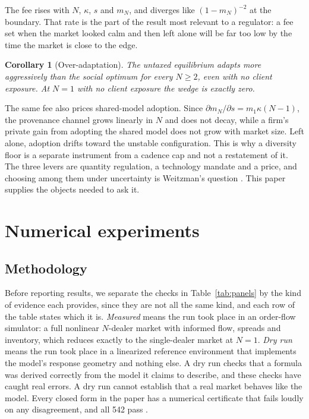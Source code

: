 \documentclass[conference]{IEEEtran}
\theoremstyle{plain}
\newtheorem{corollary}{Corollary}
\newcommand{\mN}{m_N}
\begin{document}
The fee rises with $N$, $\kappa$, $s$ and $\mN$, and diverges like $(1-\mN)^{-2}$ at the boundary. That rate is the part of the result most relevant to a regulator: a fee set when the market looked calm and then left alone will be far too low by the time the market is close to the edge.

\begin{corollary}[Over-adaptation]
\label{cor:over}
The untaxed equilibrium adapts more aggressively than the social optimum for every $N\ge2$, even with no client exposure. At $N=1$ with no client exposure the wedge is exactly zero.
\end{corollary}

The same fee also prices shared-model adoption. Since $\partial\mN/\partial s=m_1\kappa(N-1)$, the provenance channel grows linearly in $N$ and does not decay, while a firm's private gain from adopting the shared model does not grow with market size. Left alone, adoption drifts toward the unstable configuration. This is why a diversity floor is a separate instrument from a cadence cap and not a restatement of it. The three levers are quantity regulation, a technology mandate and a price, and choosing among them under uncertainty is Weitzman's question \cite{weitzman1974}. This paper supplies the objects needed to ask it.

\section{Numerical experiments}
\label{sec:evidence}

\subsection{Methodology}
Before reporting results, we separate the checks in Table~\ref{tab:panels} by the kind of evidence each provides, since they are not all the same kind, and each row of the table states which it is. \emph{Measured} means the run took place in an order-flow simulator: a full nonlinear $N$-dealer market with informed flow, spreads and inventory, which reduces exactly to the single-dealer market at $N=1$. \emph{Dry run} means the run took place in a linearized reference environment that implements the model's response geometry and nothing else. A dry run checks that a formula was derived correctly from the model it claims to describe, and these checks have caught real errors. A dry run cannot establish that a real market behaves like the model. Every closed form in the paper has a numerical certificate that fails loudly on any disagreement, and all 542 pass \cite{price2026}.
\end{document}
